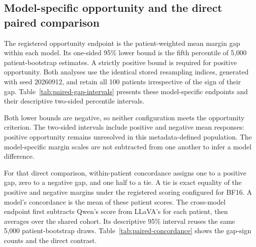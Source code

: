 \subsection{Model-specific opportunity and the direct paired comparison}

The registered opportunity endpoint is the patient-weighted mean margin
gap within each model. Its one-sided 95\% lower bound is the fifth
percentile of 5,000 patient-bootstrap estimates. A strictly positive bound
is required for positive opportunity. Both analyses use the identical
stored resampling indices, generated with seed 20260912, and retain all
100 patients irrespective of the sign of their gap.
Table~\ref{tab:paired-gap-intervals} presents these model-specific endpoints
and their descriptive two-sided percentile intervals.

\begin{table}[H]
\centering
\caption{Uncertainty in paired Consolidation response.}
\label{tab:paired-gap-intervals}
\end{table}

Both lower bounds are negative, so neither configuration meets the
opportunity criterion. The two-sided intervals include positive and
negative mean responses: positive opportunity remains unresolved in this
metadata-defined population. The model-specific margin scales are not
subtracted from one another to infer a model difference.

For that direct comparison, within-patient concordance assigns one to a
positive gap, zero to a negative gap, and one half to a tie. A tie is exact
equality of the positive and negative margins under the registered scoring
configured for BF16. A model's concordance is the mean of these patient
scores. The cross-model endpoint
first subtracts Qwen's score from LLaVA's for each patient, then averages
over the shared cohort. Its descriptive 95\% interval reuses the same
5,000 patient-bootstrap draws. Table~\ref{tab:paired-concordance} shows the
gap-sign counts and the direct contrast.

